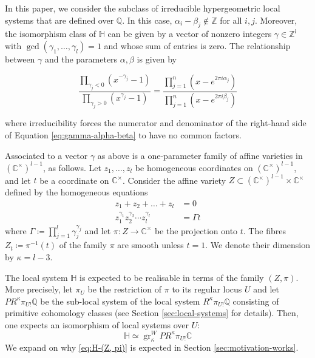 \documentclass[11pt, reqno]{amsart}
\theoremstyle{plain}
\theoremstyle{definition}
\newcommand{\CC}{\mathbb{C}}
\newcommand{\Z}{\mathbb{Z}}
\newcommand{\QQ}{\mathbb{Q}}
\newcommand{\HH}{\mathbb{H}}
\newcommand{\ga}{\gamma}
\DeclareMathOperator{\gr}{gr}
\begin{document}
In this paper, we consider the subclass of irreducible hypergeometric local systems that are defined over $\QQ$.
In this case, $\alpha_i - \beta_j \notin \Z$ for all $i, j$. Moreover, the isomorphism class of $\HH$ can be given by a vector of nonzero integers $\gamma \in \Z^{l}$ with  $\gcd(\ga_1,\dots, \ga_l)=1$ and whose sum of entries is zero. 
The relationship between $\gamma$ and the parameters $\alpha, \beta$ is given by 

\begin{equation}
\label{eq:gamma-alpha-beta}
\frac{\prod_{\ga_j <0} \left( x^{-\ga_j} -1 \right) }{\prod_{\ga_j >0} \left( x^{\ga_j} -1 \right)} = \frac{ \prod_{j=1}^{n} (x- e^{2 \pi i \alpha_j} ) }{ \prod_{j=1}^{n} (x- e^{2 \pi i \beta_j} ) }
\end{equation}
\vspace{0.05 cm}

\noindent where irreducibility forces the numerator and denominator of the right-hand side of Equation \eqref{eq:gamma-alpha-beta} to have no common factors.

Associated to a vector $\gamma$ as above is a one-parameter family of affine varieties in $(\CC^\times)^{l-1}$, as follows.
Let $z_1, \dots, z_l$  be homogeneous coordinates on $(\CC^\times)^{l-1}$, and let $t$ be a coordinate on $ \CC^\times$.
Consider the affine variety $Z \subset (\CC^\times)^{l-1} \times \CC^\times$ defined by the homogeneous equations
\begin{equation}
     \begin{split}
    z_1+z_2+\dots +z_{l} &= 0 \\
    z_1^{\gamma_1}z_2^{\gamma_2} \cdots z_{l}^{\gamma_{l}}  &= \Gamma t
\end{split}
\end{equation}
where $ \Gamma\coloneqq \prod_{j=1}^l \gamma_j^{\gamma_j}$ and let $\pi \colon Z \to \CC^\times$ be the projection onto $t$. 
The fibres $Z_t \coloneqq \pi^{-1}(t)$ of the family $\pi$ are smooth unless $t=1$. We denote their dimension by $\kappa=l-3$.

The local system $\HH$ is expected to be realisable in terms of the family $(Z, \pi)$. More precisely, let $\pi_U$ be the restriction of $\pi$ to its regular locus $U$ and let $PR^\kappa \pi_{U !} \QQ$ be the sub-local system of the local system $R^\kappa \pi_{U !} \QQ$ consisting of primitive cohomology classes (see Section \ref{sec:local-systems} for details). Then, one expects an isomorphism of local systems over $U$:
\begin{equation}
\label{eq:H-(Z, pi)}
\HH    \simeq  \gr_\kappa^W PR^\kappa \pi_{U !}  \CC
\end{equation}
We expand on why \eqref{eq:H-(Z, pi)} is expected in Section \ref{sec:motivation-works}. 
\end{document}
